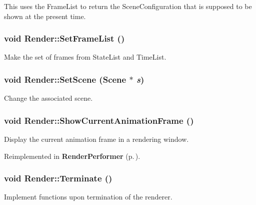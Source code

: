 This uses the Frame\-List to return the Scene\-Configuration that is supposed to be shown at the present time.

\subsubsection{\setlength{\rightskip}{0pt plus 5cm}void Render::Set\-Frame\-List ()\hspace{0.3cm}{\tt  [virtual]}}\label{classRender_a9}


Make the set of frames from State\-List and Time\-List.

\subsubsection{\setlength{\rightskip}{0pt plus 5cm}void Render::Set\-Scene ({\bf Scene} $\ast$ {\em s})}\label{classRender_a14}


Change the associated scene.

\subsubsection{\setlength{\rightskip}{0pt plus 5cm}void Render::Show\-Current\-Animation\-Frame ()\hspace{0.3cm}{\tt  [inline, protected, virtual]}}\label{classRender_b1}


Display the current animation frame in a rendering window.



Reimplemented in {\bf Render\-Performer} {\rm (p.\,\pageref{classRenderPerformer_b0})}.
\subsubsection{\setlength{\rightskip}{0pt plus 5cm}void Render::Terminate ()\hspace{0.3cm}{\tt  [inline, virtual]}}\label{classRender_a8}


Implement functions upon termination of the renderer.



